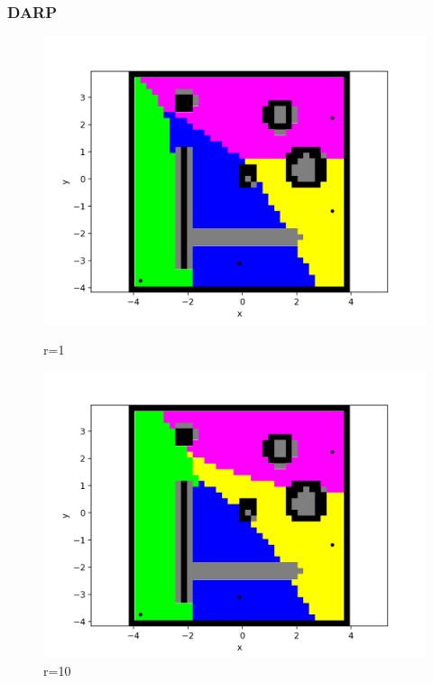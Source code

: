 \documentclass{beamer}
\begin{document}
	
	\begin{frame}
		\frametitle{DARP}
		\begin{figure}[H]
			\begin{minipage}{0.3\textwidth}
    			\includegraphics[width=\linewidth]{DARPImages/0}
    			\caption{r=1}
    		\end{minipage}
    		\hspace{\fill} %
    		\begin{minipage}{0.3\textwidth}
    			\includegraphics[width=\linewidth]{DARPImages/10}
    			\caption{r=10}
    		\end{minipage}
    		\hspace{\fill} %

\end{figure}
\end{frame}
\end{document}
